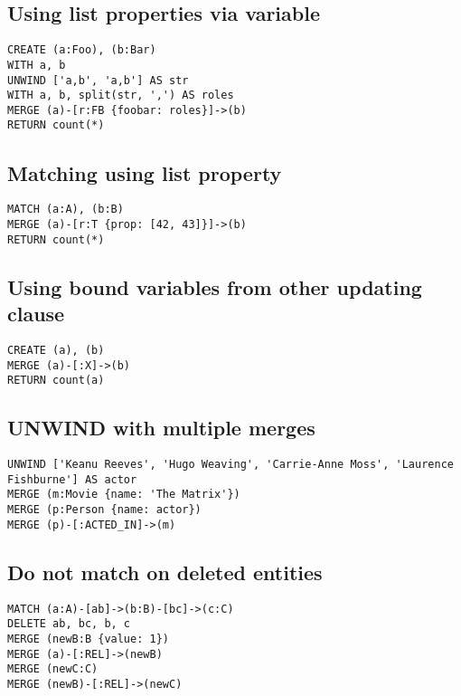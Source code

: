 \subsection{Using list properties via variable}

\begin{lstlisting}
CREATE (a:Foo), (b:Bar)
WITH a, b
UNWIND ['a,b', 'a,b'] AS str
WITH a, b, split(str, ',') AS roles
MERGE (a)-[r:FB {foobar: roles}]->(b)
RETURN count(*)
\end{lstlisting}

\subsection{Matching using list property}

\begin{lstlisting}
MATCH (a:A), (b:B)
MERGE (a)-[r:T {prop: [42, 43]}]->(b)
RETURN count(*)
\end{lstlisting}

\subsection{Using bound variables from other updating clause}

\begin{lstlisting}
CREATE (a), (b)
MERGE (a)-[:X]->(b)
RETURN count(a)
\end{lstlisting}

\subsection{UNWIND with multiple merges}

\begin{lstlisting}
UNWIND ['Keanu Reeves', 'Hugo Weaving', 'Carrie-Anne Moss', 'Laurence Fishburne'] AS actor
MERGE (m:Movie {name: 'The Matrix'})
MERGE (p:Person {name: actor})
MERGE (p)-[:ACTED_IN]->(m)
\end{lstlisting}

\subsection{Do not match on deleted entities}

\begin{lstlisting}
MATCH (a:A)-[ab]->(b:B)-[bc]->(c:C)
DELETE ab, bc, b, c
MERGE (newB:B {value: 1})
MERGE (a)-[:REL]->(newB)
MERGE (newC:C)
MERGE (newB)-[:REL]->(newC)
\end{lstlisting}

